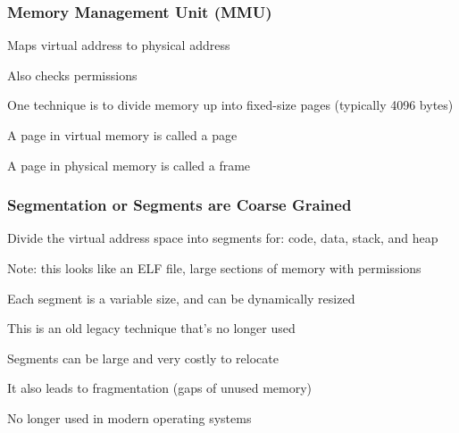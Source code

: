   \begin{frame}
    \frametitle{Memory Management Unit (MMU)}

    Maps virtual address to physical address

    \hspace{2em} Also checks permissions

    \vspace{2em}

    One technique is to divide memory up into fixed-size pages (typically 4096 bytes)

    \hspace{2em} A page in virtual memory is called a page

    \hspace{2em} A page in physical memory is called a frame
  \end{frame}

  \begin{frame}
    \frametitle{Segmentation or Segments are Coarse Grained}

    Divide the virtual address space into segments for: code, data, stack, and heap

    \hspace{2em} Note: this looks like an ELF file, large sections of memory with permissions

    \vspace{2em}

    Each segment is a variable size, and can be dynamically resized

    \hspace{2em} This is an old legacy technique that's no longer used

    \vspace{2em}

    Segments can be large and very costly to relocate

    \hspace{2em} It also leads to fragmentation (gaps of unused memory)

    \vspace{2em}

    No longer used in modern operating systems
  \end{frame}

